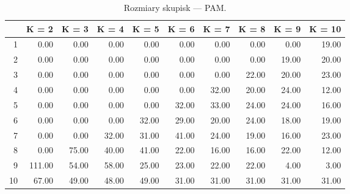 \begin{table}[ht]
\centering
\begin{tabular}{rrrrrrrrrr}
  \hline
 & K = 2 & K = 3 & K = 4 & K = 5 & K = 6 & K = 7 & K = 8 & K = 9 & K = 10 \\ 
  \hline
1 & 0.00 & 0.00 & 0.00 & 0.00 & 0.00 & 0.00 & 0.00 & 0.00 & 19.00 \\ 
  2 & 0.00 & 0.00 & 0.00 & 0.00 & 0.00 & 0.00 & 0.00 & 19.00 & 20.00 \\ 
  3 & 0.00 & 0.00 & 0.00 & 0.00 & 0.00 & 0.00 & 22.00 & 20.00 & 23.00 \\ 
  4 & 0.00 & 0.00 & 0.00 & 0.00 & 0.00 & 32.00 & 20.00 & 24.00 & 12.00 \\ 
  5 & 0.00 & 0.00 & 0.00 & 0.00 & 32.00 & 33.00 & 24.00 & 24.00 & 16.00 \\ 
  6 & 0.00 & 0.00 & 0.00 & 32.00 & 29.00 & 20.00 & 24.00 & 18.00 & 19.00 \\ 
  7 & 0.00 & 0.00 & 32.00 & 31.00 & 41.00 & 24.00 & 19.00 & 16.00 & 23.00 \\ 
  8 & 0.00 & 75.00 & 40.00 & 41.00 & 22.00 & 16.00 & 16.00 & 22.00 & 12.00 \\ 
  9 & 111.00 & 54.00 & 58.00 & 25.00 & 23.00 & 22.00 & 22.00 & 4.00 & 3.00 \\ 
  10 & 67.00 & 49.00 & 48.00 & 49.00 & 31.00 & 31.00 & 31.00 & 31.00 & 31.00 \\ 
   \hline
\end{tabular}
\caption{Rozmiary skupisk --- PAM.} 
\label{PAM3}
\end{table}
